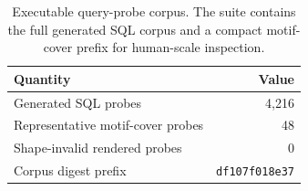 \begin{table}[t]
\centering
\caption{Executable query-probe corpus. The suite contains the full generated SQL corpus and a compact motif-cover prefix for human-scale inspection.}
\label{tab:sql-corpus}
\small
\begin{tabular}{lr}
\toprule
Quantity & Value  \\
\midrule
Generated SQL probes & 4,216  \\
Representative motif-cover probes & 48  \\
Shape-invalid rendered probes & 0  \\
Corpus digest prefix & \texttt{df107f018e37}  \\
\bottomrule
\end{tabular}
\end{table}
